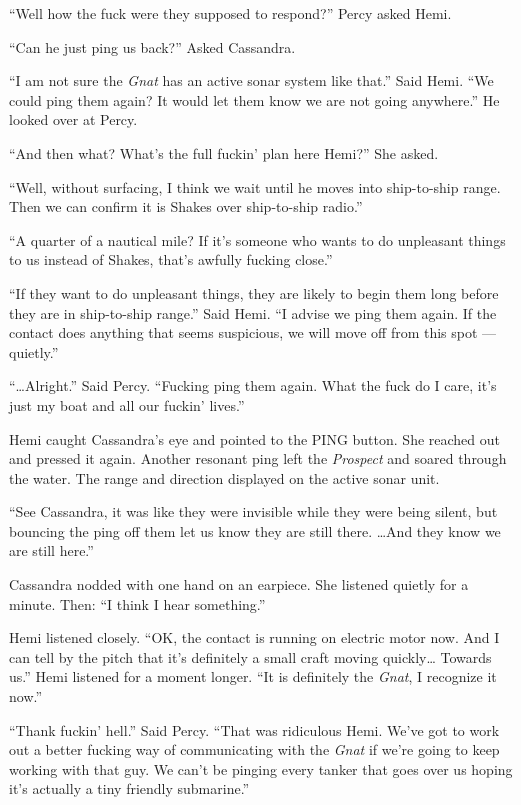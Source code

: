 \documentclass[]{scrbook}
\begin{document}
``Well how the fuck were they supposed to respond?'' Percy asked Hemi.

``Can he just ping us back?'' Asked Cassandra.

``I am not sure the \emph{Gnat} has an active sonar system like that.''
Said Hemi. ``We could ping them again? It would let them know we are not
going anywhere.'' He looked over at Percy.

``And then what? What's the full fuckin' plan here Hemi?'' She asked.

``Well, without surfacing, I think we wait until he moves into
ship-to-ship range. Then we can confirm it is Shakes over ship-to-ship
radio.''

``A quarter of a nautical mile? If it's someone who wants to do
unpleasant things to us instead of Shakes, that's awfully fucking
close.''

``If they want to do unpleasant things, they are likely to begin them
long before they are in ship-to-ship range.'' Said Hemi. ``I advise we
ping them again. If the contact does anything that seems suspicious, we
will move off from this spot --- quietly.''

``\ldots{}Alright.'' Said Percy. ``Fucking ping them again. What the
fuck do I care, it's just my boat and all our fuckin' lives.''

Hemi caught Cassandra's eye and pointed to the PING button. She reached
out and pressed it again. Another resonant ping left the \emph{Prospect}
and soared through the water. The range and direction displayed on the
active sonar unit.

``See Cassandra, it was like they were invisible while they were being
silent, but bouncing the ping off them let us know they are still there.
\ldots{}And they know we are still here.''

Cassandra nodded with one hand on an earpiece. She listened quietly for
a minute. Then: ``I think I hear something.''

Hemi listened closely. ``OK, the contact is running on electric motor
now. And I can tell by the pitch that it's definitely a small craft
moving quickly\ldots{} Towards us.'' Hemi listened for a moment longer.
``It is definitely the \emph{Gnat}, I recognize it now.''

``Thank fuckin' hell.'' Said Percy. ``That was ridiculous Hemi. We've
got to work out a better fucking way of communicating with the
\emph{Gnat} if we're going to keep working with that guy. We can't be
pinging every tanker that goes over us hoping it's actually a tiny
friendly submarine.''
\end{document}
